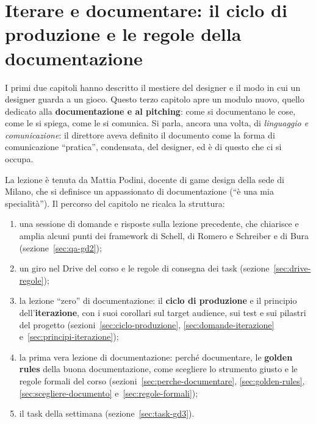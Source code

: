 
\chapter[Iterare e documentare]{Iterare e documentare: il ciclo di produzione e le regole della documentazione}
\label{cap:produzione-documentazione}

I primi due capitoli hanno descritto il mestiere del designer e il modo in
cui un designer guarda a un gioco. Questo terzo capitolo apre un modulo
nuovo, quello dedicato alla \textbf{documentazione e al pitching}: come si
documentano le cose, come le si spiega, come le si comunica. Si parla, ancora
una volta, di \emph{linguaggio e comunicazione}: il direttore aveva definito
il documento come la forma di comunicazione ``pratica'', condensata, del
designer, ed è di questo che ci si occupa.

La lezione è tenuta da Mattia Podini, docente di game design della sede di
Milano, che si definisce un appassionato di documentazione (``è una mia
specialità''). Il percorso del capitolo ne ricalca la struttura:
\begin{enumerate}
  \item una sessione di domande e risposte sulla lezione precedente, che
        chiarisce e amplia alcuni punti dei framework di Schell, di Romero e
        Schreiber e di Bura (sezione~\ref{sec:qa-gd2});
  \item un giro nel Drive del corso e le regole di consegna dei task
        (sezione~\ref{sec:drive-regole});
  \item la lezione ``zero'' di documentazione: il \textbf{ciclo di
        produzione} e il principio dell'\textbf{iterazione}, con i suoi
        corollari sul target audience, sui test e sui pilastri del progetto
        (sezioni~\ref{sec:ciclo-produzione}, \ref{sec:domande-iterazione}
        e~\ref{sec:principi-iterazione});
  \item la prima vera lezione di documentazione: perché documentare, le
        \textbf{golden rules} della buona documentazione, come scegliere lo
        strumento giusto e le regole formali del corso
        (sezioni~\ref{sec:perche-documentare}, \ref{sec:golden-rules},
        \ref{sec:scegliere-documento} e~\ref{sec:regole-formali});
  \item il task della settimana (sezione~\ref{sec:task-gd3}).
\end{enumerate}

